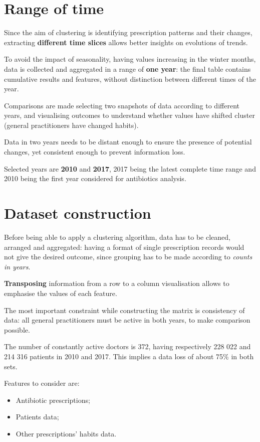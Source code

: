 \section{Range of time}
Since the aim of clustering is identifying prescription patterns and their changes, extracting \textbf{different time slices} allows better insights on evolutions of trends.

To avoid the impact of seasonality, having values increasing in the winter months, data is collected and aggregated in a range of \textbf{one year}: the final table contains cumulative results and features, without distinction between different times of the year.

Comparisons are made selecting two snapshots of data according to different years, and visualising outcomes to understand whether values have shifted cluster (general practitioners have changed habits).

Data in two years needs to be distant enough to ensure the presence of potential changes, yet consistent enough to prevent information loss. 

Selected years are \textbf{2010} and \textbf{2017}, 2017 being the latest complete time range and 2010 being the first year considered for antibiotics analysis.

\section{Dataset construction}
Before being able to apply a clustering algorithm, data has to be cleaned, arranged and aggregated: having a format of single prescription records would not give the desired outcome, since grouping has to be made according to \textit{counts in years}.

\textbf{Transposing} information from a row to a column visualisation allows to emphasise the values of each feature.

The most important constraint while constructing the matrix is consistency of data: all general practitioners must be active in both years, to make comparison possible.

The number of constantly active doctors is 372, having respectively 228 022 and 214 316 patients in 2010 and 2017. This implies a data loss of about 75\% in both sets.

Features to consider are:
\begin{itemize}
	\item Antibiotic prescriptions;
	\item Patients data;
	\item Other prescriptions' habits data.
\end{itemize}

